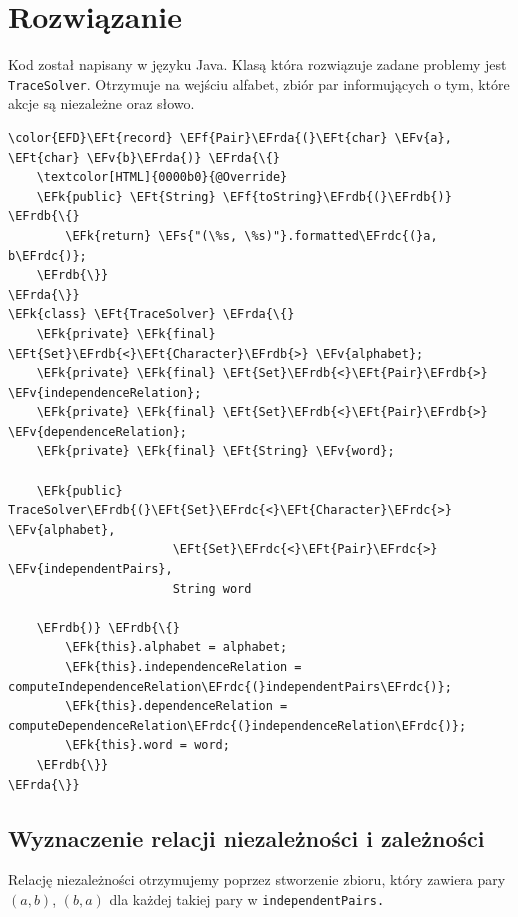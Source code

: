 \documentclass[11pt]{article}
\newcommand{\EFs}[1]{\textcolor{EFs}{#1}} %
\newcommand{\EFk}[1]{\textcolor{EFk}{#1}} %
\newcommand{\EFf}[1]{\textcolor{EFf}{#1}} %
\newcommand{\EFv}[1]{\textcolor{EFv}{#1}} %
\newcommand{\EFt}[1]{\textcolor{EFt}{#1}} %
\newcommand{\EFrda}[1]{#1} %
\newcommand{\EFrdb}[1]{\textcolor{EFrdb}{#1}} %
\newcommand{\EFrdc}[1]{\textcolor{EFrdc}{#1}} %
\begin{document}
\section*{Rozwiązanie}
\label{sec:orgf45434e}
Kod został napisany w języku Java.
Klasą która rozwiązuje zadane problemy jest \texttt{TraceSolver}. Otrzymuje na wejściu alfabet,
zbiór par informujących o tym, które akcje są niezależne oraz słowo.
\begin{Code}
\begin{Verbatim}
\color{EFD}\EFt{record} \EFf{Pair}\EFrda{(}\EFt{char} \EFv{a}, \EFt{char} \EFv{b}\EFrda{)} \EFrda{\{}
    \textcolor[HTML]{0000b0}{@Override}
    \EFk{public} \EFt{String} \EFf{toString}\EFrdb{(}\EFrdb{)} \EFrdb{\{}
        \EFk{return} \EFs{"(\%s, \%s)"}.formatted\EFrdc{(}a, b\EFrdc{)};
    \EFrdb{\}}
\EFrda{\}}
\EFk{class} \EFt{TraceSolver} \EFrda{\{}
    \EFk{private} \EFk{final} \EFt{Set}\EFrdb{<}\EFt{Character}\EFrdb{>} \EFv{alphabet};
    \EFk{private} \EFk{final} \EFt{Set}\EFrdb{<}\EFt{Pair}\EFrdb{>} \EFv{independenceRelation};
    \EFk{private} \EFk{final} \EFt{Set}\EFrdb{<}\EFt{Pair}\EFrdb{>} \EFv{dependenceRelation};
    \EFk{private} \EFk{final} \EFt{String} \EFv{word};

    \EFk{public} TraceSolver\EFrdb{(}\EFt{Set}\EFrdc{<}\EFt{Character}\EFrdc{>} \EFv{alphabet},
                       \EFt{Set}\EFrdc{<}\EFt{Pair}\EFrdc{>} \EFv{independentPairs},
                       String word

    \EFrdb{)} \EFrdb{\{}
        \EFk{this}.alphabet = alphabet;
        \EFk{this}.independenceRelation = computeIndependenceRelation\EFrdc{(}independentPairs\EFrdc{)};
        \EFk{this}.dependenceRelation = computeDependenceRelation\EFrdc{(}independenceRelation\EFrdc{)};
        \EFk{this}.word = word;
    \EFrdb{\}}
\EFrda{\}}
\end{Verbatim}
\end{Code}
\subsection*{Wyznaczenie relacji niezależności i zależności}
\label{sec:org38fc181}
Relację niezależności otrzymujemy poprzez stworzenie zbioru, który zawiera pary \((a,b)\), \((b,a)\)
dla każdej takiej pary w \texttt{independentPairs.}
\end{document}
